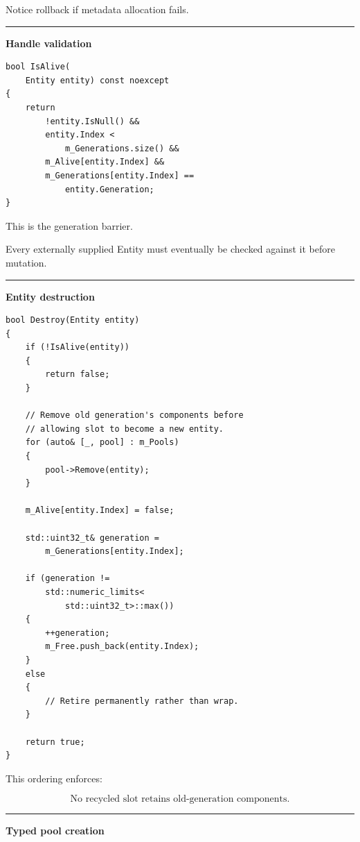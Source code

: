 Notice rollback if metadata allocation fails.

\begin{center}\rule{0.5\linewidth}{0.5pt}\end{center}

\textbf{Handle validation}

\begin{verbatim}
bool IsAlive(
    Entity entity) const noexcept
{
    return
        !entity.IsNull() &&
        entity.Index <
            m_Generations.size() &&
        m_Alive[entity.Index] &&
        m_Generations[entity.Index] ==
            entity.Generation;
}
\end{verbatim}

This is the generation barrier.

Every externally supplied Entity must eventually be checked against it before mutation.

\begin{center}\rule{0.5\linewidth}{0.5pt}\end{center}

\textbf{Entity destruction}

\begin{verbatim}
bool Destroy(Entity entity)
{
    if (!IsAlive(entity))
    {
        return false;
    }

    // Remove old generation's components before
    // allowing slot to become a new entity.
    for (auto& [_, pool] : m_Pools)
    {
        pool->Remove(entity);
    }

    m_Alive[entity.Index] = false;

    std::uint32_t& generation =
        m_Generations[entity.Index];

    if (generation !=
        std::numeric_limits<
            std::uint32_t>::max())
    {
        ++generation;
        m_Free.push_back(entity.Index);
    }
    else
    {
        // Retire permanently rather than wrap.
    }

    return true;
}
\end{verbatim}

This ordering enforces:

\[
\boxed{
\text{No recycled slot retains old-generation components}.
}
\]

\begin{center}\rule{0.5\linewidth}{0.5pt}\end{center}

\textbf{Typed pool creation}

